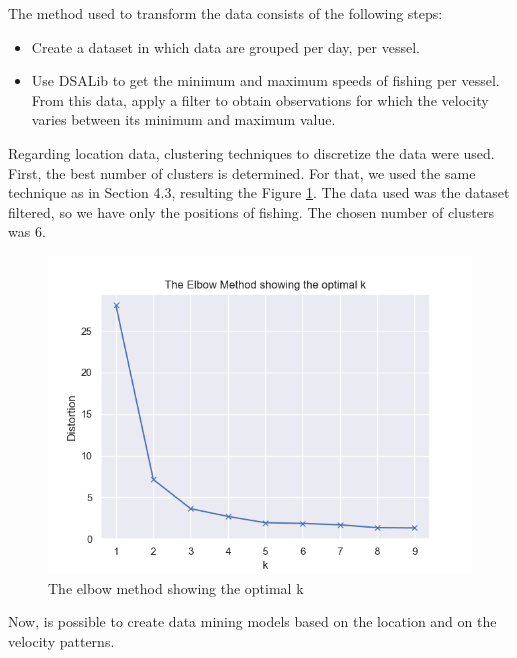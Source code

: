 The method used to transform the data consists of the following steps:
\begin{itemize}
\item Create a dataset in which data are grouped per day, per vessel.
\item Use DSALib to get the minimum and maximum speeds of fishing per vessel. From this data, apply a filter to obtain observations for which the velocity varies between its minimum and maximum value.

\end{itemize}


Regarding location data, clustering techniques to discretize the data were used.
First, the best number of clusters is determined. For that, we used the same technique as in Section 4.3, resulting the Figure \ref{fig:elbow_method_server}. The data used was the dataset filtered, so we have only the positions of fishing. The chosen number of clusters was 6.

\begin{figure}[H]
\centering
\includegraphics[width=0.8\linewidth]{Chapters/img/elbow_method_server.png}
\caption{The elbow method showing the optimal k}
\label{fig:elbow_method_server}
\end{figure}
Now, is possible to create data mining models based on the location and on the velocity patterns. 


\newpage

